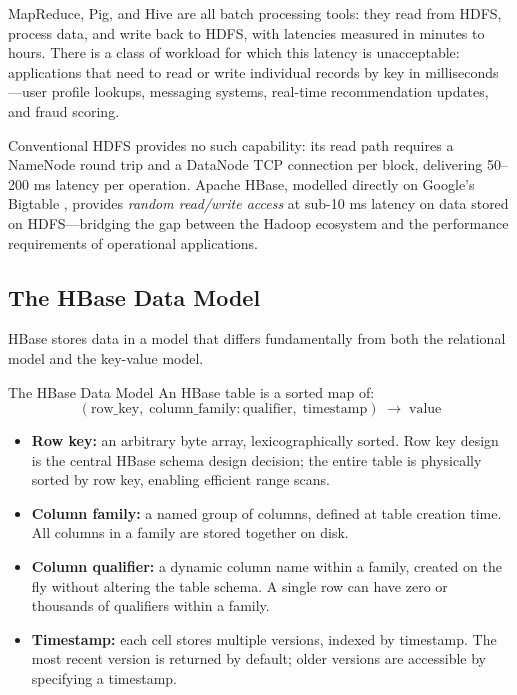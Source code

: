 MapReduce, Pig, and Hive are all batch processing tools: they read
from HDFS, process data, and write back to HDFS, with latencies
measured in minutes to hours. There is a class of workload for which
this latency is unacceptable: applications that need to read or write
individual records by key in milliseconds---user profile lookups,
messaging systems, real-time recommendation updates, and fraud
scoring.

Conventional HDFS provides no such capability: its read path requires
a NameNode round trip and a DataNode TCP connection per block,
delivering 50--200 ms latency per operation. Apache HBase, modelled
directly on Google's Bigtable \parencite{Bigtable2006}, provides
\emph{random read/write access} at sub-10 ms latency on data stored
on HDFS---bridging the gap between the Hadoop ecosystem and the
performance requirements of operational applications.

\subsection{The HBase Data Model}
\label{subsec:hbase-model}

HBase stores data in a model that differs fundamentally from both the
relational model and the key-value model.

\begin{defbox}{The HBase Data Model}
An HBase table is a sorted map of:
\[
(\text{row\_key},\; \text{column\_family}:\text{qualifier},\; \text{timestamp}) \;\longrightarrow\; \text{value}
\]
\begin{itemize}
  \item \textbf{Row key:} an arbitrary byte array, lexicographically
        sorted. Row key design is the central HBase schema design
        decision; the entire table is physically sorted by row key,
        enabling efficient range scans.
  \item \textbf{Column family:} a named group of columns, defined at
        table creation time. All columns in a family are stored
        together on disk.
  \item \textbf{Column qualifier:} a dynamic column name within a
        family, created on the fly without altering the table schema.
        A single row can have zero or thousands of qualifiers within
        a family.
  \item \textbf{Timestamp:} each cell stores multiple versions,
        indexed by timestamp. The most recent version is returned by
        default; older versions are accessible by specifying a
        timestamp.
\end{itemize}
\end{defbox}

